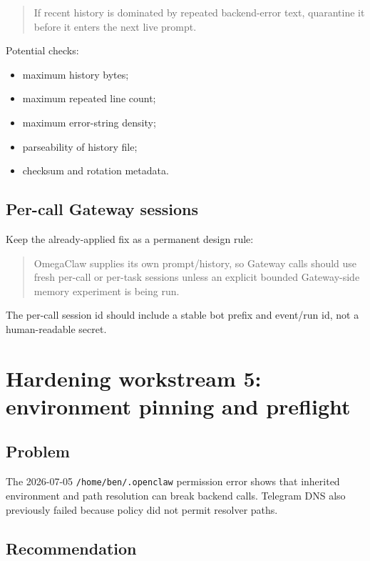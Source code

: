 \documentclass[11pt]{article}
\begin{document}
\begin{quote}
If recent history is dominated by repeated backend-error text, quarantine it before it enters the next live prompt.
\end{quote}

Potential checks:

\begin{itemize}
  \item maximum history bytes;
  \item maximum repeated line count;
  \item maximum error-string density;
  \item parseability of history file;
  \item checksum and rotation metadata.
\end{itemize}

\subsection{Per-call Gateway sessions}

Keep the already-applied fix as a permanent design rule:

\begin{quote}
OmegaClaw supplies its own prompt/history, so Gateway calls should use fresh per-call or per-task sessions unless an explicit bounded Gateway-side memory experiment is being run.
\end{quote}

The per-call session id should include a stable bot prefix and event/run id, not a human-readable secret.

\section{Hardening workstream 5: environment pinning and preflight}

\subsection{Problem}

The 2026-07-05 \texttt{/home/ben/.openclaw} permission error shows that inherited environment and path resolution can break backend calls. Telegram DNS also previously failed because policy did not permit resolver paths.

\subsection{Recommendation}
\end{document}
